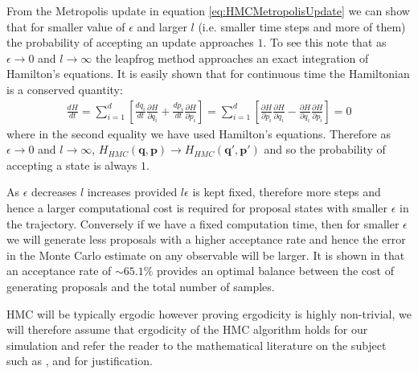 \documentclass[12pt]{article}
\begin{document}
            From the Metropolis update in equation \ref{eq:HMCMetropolisUpdate} we can show that for smaller value of $\epsilon$ and larger $l$ (i.e. smaller time steps and more of them) the probability of accepting an update approaches $1$. To see this note that as $\epsilon \rightarrow 0$ and $l \rightarrow \infty$ the leapfrog method approaches an exact integration of Hamilton's equations. It is easily shown that for continuous time the Hamiltonian is a conserved quantity:
            \begin{align}
            \frac{dH}{dt}=\sum_{i=1}^{d}\left[\frac{dq_i}{dt}\frac{\partial H}{\partial q_i}+\frac{dp_i}{dt}\frac{\partial H}{\partial p_i}\right]=\sum_{i=1}^{d}\left[\frac{\partial H}{\partial p_i}\frac{\partial H}{\partial q_i}-\frac{\partial H}{\partial q_i}\frac{\partial H}{\partial p_i}\right]=0
            \end{align}
            where in the second equality we have used Hamilton's equations. Therefore as $\epsilon \rightarrow 0$ and $l\rightarrow \infty$, $H_{HMC}\left(\bm{q},\bm{p}\right) \rightarrow H_{HMC}\left(\bm{q}',\bm{p}'\right)$ and so the probability of accepting a state is always $1$.   

            As $\epsilon$ decreases $l$ increases provided $l\epsilon$ is kept fixed, therefore more steps and hence a larger computational cost is required for proposal states with smaller $\epsilon$ in the trajectory. Conversely if we have a fixed computation time, then for smaller $\epsilon$ we will generate less proposals with a higher acceptance rate and hence the error in the Monte Carlo estimate on any observable will be larger. It is shown in \cite{beskos_pillai_roberts_sanz-serna_stuart_2013} that an acceptance rate of $\sim 65.1\%$ provides an optimal balance between the cost of generating proposals and the total number of samples.

            HMC will be typically ergodic \cite{neal_2011} however proving ergodicity is highly non-trivial, we will therefore assume that ergodicity of the HMC algorithm holds for our simulation and refer the reader to the mathematical literature on the subject such as \cite{bou-rabee_sanz-serna_2017}, \cite{durmus_moulines_saksman} and \cite{livingstone_betancourt_byrne_girolami} for justification.
\end{document}
